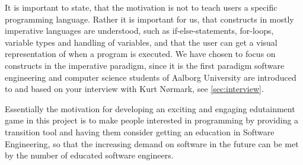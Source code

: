 It is important to state, that the motivation is not to teach users a specific programming language.
Rather it is important for us, that constructs in mostly imperative languages are understood, such as if-else-statements, for-loops, variable types and handling of variables, and that the user can get a visual representation of when a program is executed. We have chosen to focus on constructs in the imperative paradigm, since it is the first paradigm software engineering and computer science students of Aalborg University are introduced to and based on your interview with Kurt N{\o}rmark, see \autoref{sec:interview}.\newline

Essentially the motivation for developing an exciting and engaging edutainment game in this project is to make people interested in programming by providing a transition tool and having them consider getting an education in Software Engineering, so that the increasing demand on software in the future can be met by the number of educated software engineers.\citep{idaArtikelMangel}